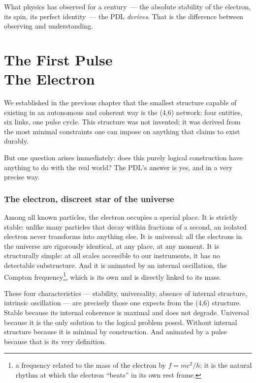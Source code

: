 \documentclass[12pt, a4paper, openright]{book}
\begin{document}
\medskip

What physics has observed for a century~--- the absolute stability of the electron, its spin, its perfect identity~--- the PDL \emph{derives}. That is the difference between observing and understanding.

\chapter[The First Pulse --- The Electron]{The First Pulse \\ The Electron}

We established in the previous chapter that the smallest structure capable of existing in an autonomous and coherent way is the (4,6) network: four entities, six links, one pulse cycle. This structure was not invented; it was derived from the most minimal constraints one can impose on anything that claims to exist durably.

\medskip

But one question arises immediately: does this purely logical construction have anything to do with the real world? The PDL’s answer is yes, and in a very precise way.

\subsection*{The electron, discreet star of the universe}

Among all known particles, the electron occupies a special place. It is strictly stable: unlike many particles that decay within fractions of a second, an isolated electron never transforms into anything else. It is universal: all the electrons in the universe are rigorously identical, at any place, at any moment. It is structurally simple: at all scales accessible to our instruments, it has no detectable substructure. And it is animated by an internal oscillation, the Compton frequency\footnote{a frequency related to the mass of the electron by $f = mc^2/h$; it is the natural rhythm at which the electron “beats” in its own rest frame.}, which is its own and is directly linked to its mass.

\medskip

These four characteristics — stability, universality, absence of internal structure, intrinsic oscillation — are precisely those one expects from the (4,6) structure. Stable because its internal coherence is maximal and does not degrade. Universal because it is the only solution to the logical problem posed. Without internal structure because it is minimal by construction. And animated by a pulse because that is its very definition.
\end{document}
